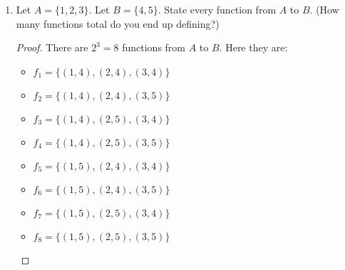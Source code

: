 \documentclass{article}
\begin{document}
\begin{enumerate}
\begin{proof}
    To show that $f$ is a function from $A$ to $B$, we need to verify that each element in $A$ is associated with exactly one element in $B$. According to the definition of a function, for every input (element in the domain $A$), there must be a unique output (element in the codomain $B$).

    In this case, $f = \{(6,8),(7,8)\}$. We see that:
    \begin{itemize}
        \item The element $6 \in A$ is associated with the element $8 \in B$.
        \item The element $7 \in A$ is associated with the element $8 \in B$.
    \end{itemize}
    Each element in $A$ is associated with exactly one element in $B$, and there are no elements in $A$ that are associated with more than one element in $B$. Therefore, $f$ satisfies the definition of a function.

    Additionally, the non-numbered part of the definition of a function states that every element in the domain must be mapped to an element in the codomain. In this case, both elements $6$ and $7$ in $A$ are mapped to elements in $B$, satisfying this part of the definition as well.

    Therefore, $f$ is a function from $A$ to $B$.
\end{proof}

\newpage

\item Let $A = \{1,2,3\}$. Let $B = \{4,5\}$. State every function from $A$ to $B$. (How many functions total do you end up defining?)

\begin{proof}
    There are $2^3 = 8$ functions from $A$ to $B$. Here they are:
    \begin{itemize}
        \item $f_1 = \{(1,4),(2,4),(3,4)\}$
        \item $f_2 = \{(1,4),(2,4),(3,5)\}$
        \item $f_3 = \{(1,4),(2,5),(3,4)\}$
        \item $f_4 = \{(1,4),(2,5),(3,5)\}$
        \item $f_5 = \{(1,5),(2,4),(3,4)\}$
        \item $f_6 = \{(1,5),(2,4),(3,5)\}$
        \item $f_7 = \{(1,5),(2,5),(3,4)\}$
        \item $f_8 = \{(1,5),(2,5),(3,5)\}$
    \end{itemize}
\end{proof}


\end{enumerate}
\end{document}
